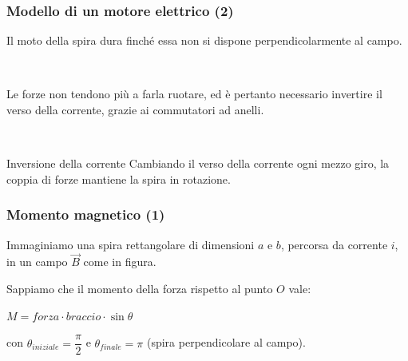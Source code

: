 \documentclass[]{beamer}
\theoremstyle{plain}
\begin{document}
\begin{frame}
\frametitle{Modello di un motore elettrico (2)}
Il moto della spira dura finché essa non si dispone perpendicolarmente al campo.\pause

~

Le forze non tendono più a farla ruotare, ed è pertanto necessario invertire il verso della corrente, grazie ai \alert{commutatori ad anelli}.

~

\begin{center}
\href{video/Motoreelettrico.mp4}{}
\end{center}
\begin{center}
\href{gif/motoreelettrico.gif}{}
\end{center}\pause
\begin{block}{Inversione della corrente}
Cambiando il verso della corrente ogni mezzo giro, la coppia di forze mantiene la spira in rotazione.
\end{block}
\end{frame}


\begin{frame}
\frametitle{Momento magnetico (1)}
Immaginiamo una spira rettangolare di dimensioni $ a $ e $ b $, percorsa da corrente $ i $, in un campo $ \vec{B} $ come in figura.

\begin{figure}
\end{figure}\pause
Sappiamo che il momento della forza rispetto al punto $ O $ vale:
\begin{center}
$ M = forza \cdot braccio \cdot \sin\theta $
\end{center}
con $ \theta_{iniziale} = \dfrac{\pi}{2} $ e $ \theta_{finale} = \pi $ (spira perpendicolare al campo).
\end{frame}
\end{document}
